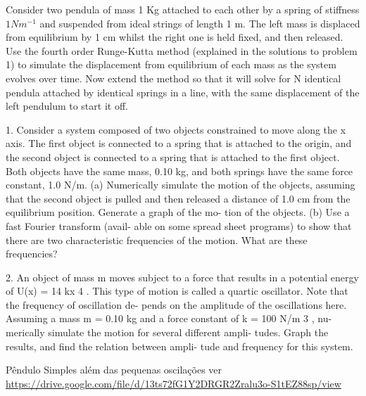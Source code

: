 Consider two pendula of mass 1 Kg attached to each other by a spring of stiffness $1 Nm^{-1}$ and suspended from ideal strings of length 1 m. The left mass is displaced from equilibrium by 1 cm whilst the right one is held fixed, and then released. Use the fourth order Runge-Kutta method (explained in the solutions to problem 1) to simulate the displacement from equilibrium of each mass as the system evolves over time. Now extend the method so that it will solve for N identical pendula attached by identical springs in a line, with the same displacement of the left pendulum to start it off.

1. Consider a system composed of two objects constrained
to move along the x axis. The first object is connected to
a spring that is attached to the origin, and the second object
is connected to a spring that is attached to the first object.
Both objects have the same mass, 0.10 kg, and both springs
have the same force constant, 1.0 N/m. (a) Numerically
simulate the motion of the objects, assuming that the second
object is pulled and then released a distance of 1.0 cm
from the equilibrium position. Generate a graph of the mo-
tion of the objects. (b) Use a fast Fourier transform (avail-
able on some spread sheet programs) to show that there
are two characteristic frequencies of the motion. What are
these frequencies?

2. An object of mass m moves subject to a force that results in a
potential energy of U(x) = 14 kx 4 . This type of motion is called
a quartic oscillator. Note that the frequency of oscillation de-
pends on the amplitude of the oscillations here. Assuming a
mass m = 0.10 kg and a force constant of k = 100 N/m 3 , nu-
merically simulate the motion for several different ampli-
tudes. Graph the results, and find the relation between ampli-
tude and frequency for this system.

Pêndulo Simples além das pequenas oscilações
ver  \href{URL}{https://drive.google.com/file/d/13ts72fG1Y2DRGR2Zralu3o-S1tEZ88sp/view}

